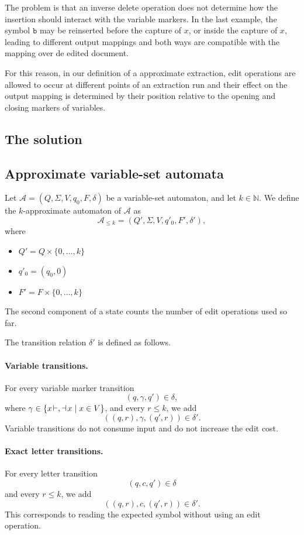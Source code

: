 The problem is that an inverse delete operation does not determine how the insertion should interact with the variable markers. In the last example, the symbol \(\mathtt b\) may be reinserted
before the capture of \(x\), or inside the capture of \(x\), leading to
different output mappings and both ways are compatible with the mapping over de edited document.


For this reason, in our definition of a approximate extraction, edit operations are allowed to occur at different points of an extraction run and their effect on the output mapping is determined by their position relative to the opening and closing markers of variables.


\subsection{The solution}

\subsection{Approximate variable-set automata}



Let $\mathcal{A}=(Q,\Sigma,V,q_0,F,\delta)$
be a variable-set automaton, and let \(k\in\mathbb{N}\). We define the
\(k\)-approximate automaton of \(\mathcal{A}\) as
\[
\mathcal{A}_{\leq k}=(Q',\Sigma,V,q'_0,F',\delta'),
\]
where
\begin{itemize}
	\item $Q'=Q\times\{0,\ldots,k\}$
	\item $q'_0=(q_0,0)$
	\item $F'=F\times\{0,\ldots,k\}$
\end{itemize}


The second component of a state counts the number of edit operations used so
far.

The transition relation \(\delta'\) is defined as follows.

\paragraph{Variable transitions.}
For every variable marker transition
\[
(q,\gamma,q')\in\delta,
\]
where \(\gamma\in\{x\!\vdash,\dashv\!x\mid x\in V\}\), and every \(r\leq k\), we add
\[
((q,r),\gamma,(q',r))\in\delta'.
\]
Variable transitions do not consume input and do not increase the edit cost.


\paragraph{Exact letter transitions.}
For every letter transition
\[
(q,c,q')\in\delta
\]
and every \(r\leq k\), we add
\[
((q,r),c,(q',r))\in\delta'.
\]
This corresponds to reading the expected symbol without using an edit operation.

